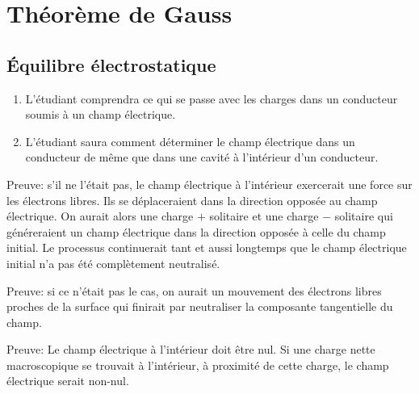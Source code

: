 \chapter{Théorème de Gauss}


\section{Équilibre électrostatique}



\begin{enumerate}
  \item L'étudiant comprendra ce qui se passe avec les charges dans un
    conducteur soumis à un champ électrique.
  \item L'étudiant saura comment déterminer le champ électrique dans un
    conducteur de même que dans une cavité à l'intérieur d'un conducteur.
\end{enumerate}



Preuve: s'il ne l'était pas, le champ électrique à l'intérieur exercerait une
force sur les électrons libres. Ils se déplaceraient dans la direction opposée
au champ électrique. On aurait alors une charge $+$ solitaire et une charge $-$
solitaire qui généreraient un champ électrique dans la direction opposée à
celle du champ initial. Le processus continuerait tant et aussi longtemps que
le champ électrique initial n'a pas été complètement neutralisé.




Preuve: si ce n'était pas le cas, on aurait un mouvement des électrons libres
proches de la surface qui finirait par neutraliser la composante tangentielle
du champ.




Preuve: Le champ électrique à l'intérieur doit être nul. Si une charge nette
macroscopique se trouvait à l'intérieur, à proximité de cette charge, le champ
électrique serait non-nul.




